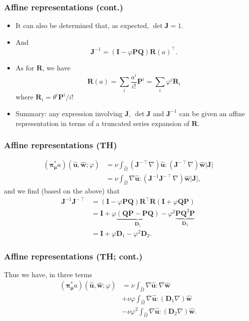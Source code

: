 \begin{frame}
  \frametitle{Affine representations (cont.)}

  \begin{itemize}
  \item It can also be determined that, as expected, $\det \bm J = 1$.
  \item And
    \[
      \bm J^{-1} = \left( \bm I - \varphi \bm P \bm Q \right)
      \bm R(a)^\intercal.
    \]
  \item As for $\bm R$, we have
    \[
      \bm R(a) = \sum_i \frac{a^i}{i!} \bm P^i = \sum_i \varphi^i \bm R_i
    \]
    where $\bm R_i = \theta^i \bm P^i / i!$
  \item Summary: any expression involving $\bm J$, $\det \bm J$ and
    $\bm J^{-1}$ can be given an affine representation in terms of a
    truncated series expansion of $\bm R$.
  \end{itemize}
\end{frame}

\begin{frame}
  \frametitle{Affine representations (TH)}

  \begin{align*}
  ({\bm\pi}^*_{\bm\mu}a)(
    \hat{\bm u},
    \hat{\bm w};
    \varphi
  )
  &= \nu \int_{\hat{\Omega}} (\bm J^{-\intercal} \nabla) \hat{\bm u} : (\bm J^{-\intercal} \nabla)
    \hat{\bm w} |\bm J| \\
  &= \nu \int_{\hat{\Omega}} \nabla \hat{\bm u} : (\bm J^{-1} \bm J^{-\intercal} \nabla) \hat{\bm w}
    |\bm J|,
  \end{align*}
  and we find (based on the above) that
  \begin{align*}
    \bm J^{-1} \bm J^{-\intercal}
    &= (\bm I - \varphi \bm P \bm Q) \bm R^\intercal
      \bm R (\bm I + \varphi \bm Q \bm P) \\
    &= \bm I + \varphi \underbrace{(\bm Q \bm P - \bm P \bm Q)}_{\bm D_1}
      - \varphi^2 \underbrace{\bm P \bm Q^2 \bm P}_{\bm D_2} \\
    &= \bm I + \varphi \bm D_1 - \varphi^2 \bm D_2.
  \end{align*}
\end{frame}

\begin{frame}
  \frametitle{Affine representations (TH; cont.)}

  Thus we have, in three terms
  \begin{align*}
    ({\bm\pi}^*_{\bm\mu}a)(
    \hat{\bm u},
    \hat{\bm w};
    \varphi
    ) &=
    \nu \int_{\hat{\Omega}} \nabla \hat{\bm u} : \nabla \hat{\bm w} \\
    &+ \nu \varphi \int_{\hat{\Omega}}
    \nabla \hat{\bm u} : (\bm D_1 \nabla) \hat{\bm w} \\
    &- \nu \varphi^2 \int_{\hat{\Omega}}
    \nabla \hat{\bm u} : (\bm D_2 \nabla) \hat{\bm w}.
  \end{align*}
\end{frame}


